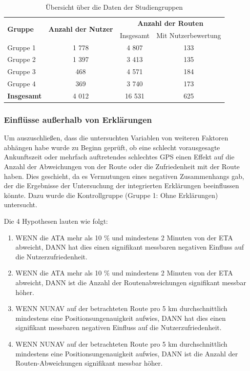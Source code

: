 \begin{table}
    \centering
    \begin{tabular}{|l|c|c|c|}
        \hline
        \multirow{2}{*}{\textbf{Gruppe}} & \multirow{2}{*}{\textbf{Anzahl der Nutzer}} & \multicolumn{2}{|c|}{\textbf{Anzahl der Routen}} \\ \cline{3-4}
        & & Insgesamt & Mit Nutzerbewertung \\ \hline \hline
        Gruppe 1            & 1 778  & 4 807  & 133 \\ \hline
        Gruppe 2            & 1 397  & 3 413  & 135 \\ \hline
        Gruppe 3            & 468   & 4 571  & 184 \\ \hline
        Gruppe 4            & 369   & 3 740  & 173 \\ \hline \hline
        \textbf{Insgesamt}  & 4 012  & 16 531 & 625 \\ \hline
    \end{tabular}
    \caption{Übersicht über die Daten der Studiengruppen}
    \label{tab:study_user_group_overview}
\end{table}

\subsubsection{Einflüsse außerhalb von Erklärungen}

Um auszuschließen, dass die untersuchten Variablen von weiteren Faktoren abhängen habe wurde zu Beginn geprüft, ob eine schlecht vorausgesagte Ankunftszeit oder mehrfach auftretendes schlechtes GPS einen Effekt auf die Anzahl der Abweichungen von der Route oder die Zufriedenheit mit der Route haben. Dies geschieht, da es Vermutungen eines negativen Zusammenhangs gab, der die Ergebnisse der Untersuchung der integrierten Erklärungen beeinflussen könnte. Dazu wurde die Kontrollgruppe (Gruppe 1: Ohne Erklärungen) untersucht.

Die 4 Hypothesen lauten wie folgt:

\begin{enumerate}
    \item[1.1] WENN die ATA mehr als 10 \% und mindestens 2 Minuten von der ETA abweicht, DANN hat dies einen signifikant messbaren negativen Einfluss auf die Nutzerzufriedenheit.
    \item[1.2] WENN die ATA mehr als 10 \% und mindestens 2 Minuten von der ETA abweicht, DANN ist die Anzahl der Routenabweichungen signifikant messbar höher.
    \item[1.3] WENN NUNAV auf der betrachteten Route pro 5 km durchschnittlich mindestens eine Positionsungenauigkeit aufwies, DANN hat dies einen signifikant messbaren negativen Einfluss auf die Nutzerzufriedenheit.
    \item[1.4] WENN NUNAV auf der betrachteten Route pro 5 km durchschnittlich mindestens eine Positionsungenauigkeit aufwies, DANN ist die Anzahl der Routen-Abweichungen signifikant messbar höher.
\end{enumerate}

